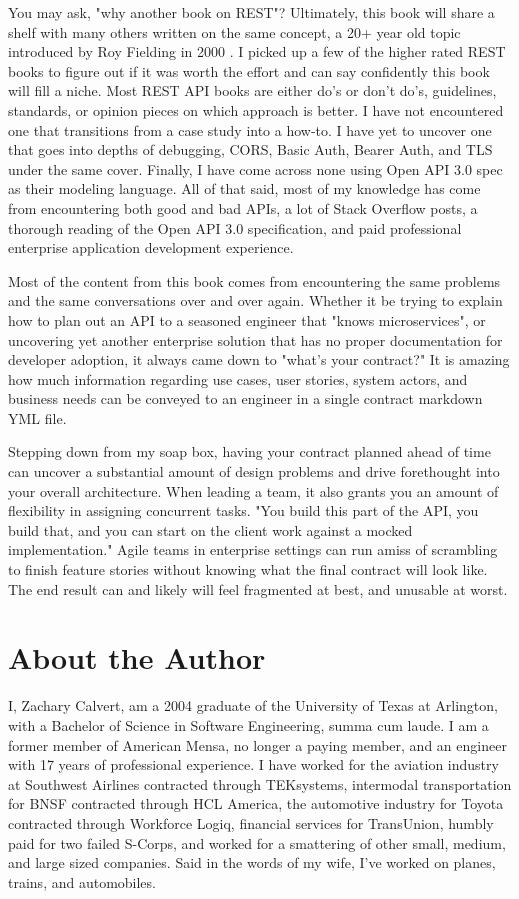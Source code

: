You may ask, "why another book on REST"?  Ultimately, this book will share a shelf with many others written on the same concept, a 20+ year old topic introduced by Roy Fielding in 2000 \cite{fielding}.  I picked up a few of the higher rated REST books to figure out if it was worth the effort and can say confidently this book will fill a niche. Most REST API books are either do's or don't do's, guidelines, standards, or opinion pieces on which approach is better.  I have not encountered one that transitions from a case study into a how-to.  I have yet to uncover one that goes into depths of debugging, CORS, Basic Auth, Bearer Auth, and TLS under the same cover.  Finally, I have come across none using Open API 3.0 spec as their modeling language.  All of that said, most of my knowledge has come from encountering both good and bad APIs, a lot of Stack Overflow posts, a thorough reading of the Open API 3.0 specification, and paid professional enterprise application development experience.

Most of the content from this book comes from encountering the same problems and the same conversations over and over again.  Whether it be trying to explain how to plan out an API to a seasoned engineer that "knows microservices", or uncovering yet another enterprise solution that has no proper documentation for developer adoption, it always came down to "what's your contract?"  It is amazing how much information regarding use cases, user stories, system actors, and business needs can be conveyed to an engineer in a single contract markdown YML file.

Stepping down from my soap box, having your contract planned ahead of time can uncover a substantial amount of design problems and drive forethought into your overall architecture.  When leading a team, it also grants you an amount of flexibility in assigning concurrent tasks.  "You build this part of the API, you build that, and you can start on the client work against a mocked implementation."  Agile teams in enterprise settings can run amiss of scrambling to finish feature stories without knowing what the final contract will look like.  The end result can and likely will feel fragmented at best, and unusable at worst.

\section*{About the Author}

I, Zachary Calvert, am a 2004 graduate of the University of Texas at Arlington, with a Bachelor of Science in Software Engineering, summa cum laude.  I am a former member of American Mensa, no longer a paying member, and an engineer with 17 years of professional experience.  I have worked for the aviation industry at Southwest Airlines contracted through TEKsystems, intermodal transportation for BNSF contracted through HCL America, the automotive industry for Toyota contracted through Workforce Logiq, financial services for TransUnion, humbly paid for two failed S-Corps, and worked for a smattering of other small, medium, and large sized companies.  Said in the words of my wife, I've worked on planes, trains, and automobiles.

